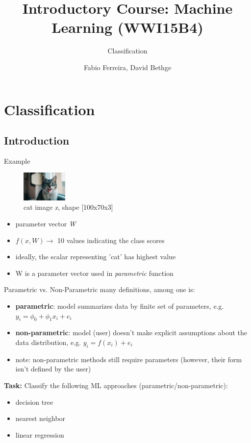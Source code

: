 \documentclass{beamer}
\title[]{Introductory Course: Machine Learning (WWI15B4)}
\subtitle{Classification \rom{2}}
\author{Fabio Ferreira, David Bethge}
\institute{Karlsruhe Institute of Technology}
\date{}
\begin{document}
%
%

\begin{frame}
  \titlepage
\end{frame}



\section{Classification}
\subsection{Introduction}

\begin{frame}{Example}
\begin{figure}
\includegraphics[width=0.2\textwidth]{cat}
\caption{cat image \emph{x}, shape [100x70x3]} 
\end{figure}



\begin{itemize}
\item parameter vector \emph{W}
\item $f(x,W) \longrightarrow$ 10 values indicating the class scores
\item ideally, the scalar representing 'cat' has highest value
\item W is a parameter vector used in \emph{parametric} function
\end{itemize}
\end{frame}

\begin{frame}{Parametric vs. Non-Parametric}
many definitions, among one is:
\begin{itemize}
\item \textbf{parametric}: model summarizes data by finite set of parameters, e.g. $y_i=\phi_0 + \phi_1x_i + e_i$ 
\item \textbf{non-parametric}: model (user) doesn't make explicit assumptions about the data distribution, e.g. $y_i = f(x_i) + e_i$
\item note: non-parametric methods still require parameters (however, their form isn't defined by the user)
\end{itemize}
\textbf{Task:} Classify the following ML approaches (parametric/non-parametric):
\begin{itemize}
\item decision tree
\item nearest neighbor
\item linear regression
\end{itemize}
\end{frame}
\end{document}
